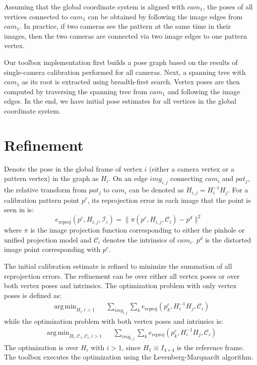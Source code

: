\documentclass{report}
\DeclareMathOperator*{\argmin}{arg\,min}
\begin{document}
Assuming that the global coordinate system is aligned with $cam_1$, the poses of all vertices connected to $cam_1$ can be obtained by following the image edges from $cam_1$. In practice, if two cameras see the pattern at the same time in their images, then the two cameras are connected via two image edges to one pattern vertex. 

Our toolbox implementation first builds a pose graph based on the results of single-camera calibration performed for all cameras. Next, a spanning tree with $cam_1$ as its root is extracted using breadth-first search. Vertex poses are then computed by traversing the spanning tree from $cam_1$ and following the image edges. In the end, we have initial pose estimates for all vertices in the global coordinate system.

\section{Refinement}
Denote the pose in the global frame of vertex $i$ (either a camera vertex or a pattern vertex) in the graph as $H_i$. On an edge $img_{i, j}$ connecting $cam_i$ and $pat_j$, the relative transform from $pat_j$ to $cam_i$ can be denoted as $H_{i, j} = H_i^{-1} H_j$. For a calibration pattern point $p^c$, its reprojection error in each image that the point is seen in is: 
\begin{equation}
e_{\textrm{reproj}}(p^c, H_{i, j}, \mathcal{I}_i) = \|\pi(p^c, H_{i, j}, \mathcal{C}_i) - p^d\|^2
\end{equation}
where $\pi$ is the image projection function corresponding to either the pinhole or unified projection model and $\mathcal{C}_i$ denotes the intrinsics of $cam_i$. $p^d$ is the distorted image point corresponding with $p^c$. 

The initial calibration estimate is refined to minimize the summation of all reprojection errors. The refinement can be over either all vertex poses or over both vertex poses and intrinsics. The optimization problem with only vertex poses is defined as: 
\begin{equation}
\begin{aligned}
& \argmin_{H_i, i > 1} & & \sum_{img_{i, j}} \sum_{k} e_{\textrm{reproj}}(p^c_k, H_i^{-1} H_j, \mathcal{C}_i) 
\end{aligned}
\end{equation}
while the optimization problem with both vertex poses and intrinsics is: 
\begin{equation}
\begin{aligned}
& \argmin_{H_i, \mathcal{C}_1, \mathcal{C}_i, i > 1} & & \sum_{img_{i, j}} \sum_{k} e_{\textrm{reproj}}(p^c_k, H_i^{-1} H_j, \mathcal{C}_i) 
\end{aligned}
\end{equation}
The optimization is over $H_i$ with $i > 1$, since $H_1 \equiv I_{4 \times 4}$ is the reference frame. The toolbox executes the optimization using the Levenberg-Marquardt algorithm. 
\end{document}
